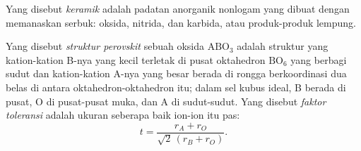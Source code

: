 \begin{definition}[Keramik]\label{def:b3:inorganic-materials:ceramic}
Yang disebut \emph{keramik} adalah padatan anorganik nonlogam yang dibuat dengan
memanaskan serbuk: oksida, nitrida, dan karbida, atau produk-produk lempung.
\end{definition}

\begin{definition}\label{def:b3:inorganic-materials:perovskite}
Yang disebut \emph{struktur perovskit} sebuah oksida $\mathrm{ABO_3}$
adalah struktur yang kation-kation B-nya yang kecil terletak di pusat oktahedron $\mathrm{BO_6}$ yang berbagi sudut dan
kation-kation A-nya yang besar berada di rongga berkoordinasi dua belas di antara oktahedron-oktahedron itu; dalam
sel kubus ideal, B berada di pusat, O di pusat-pusat muka, dan A di sudut-sudut.
Yang disebut \emph{faktor toleransi} adalah ukuran seberapa baik ion-ion itu
pas:
\[
  t = \frac{r_A + r_O}{\sqrt2\,(r_B + r_O)}.
\]
\end{definition}

